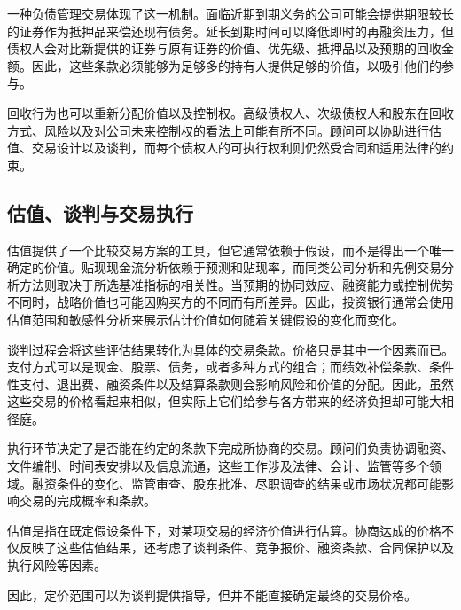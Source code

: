 一种负债管理交易体现了这一机制。面临近期到期义务的公司可能会提供期限较长的证券作为抵押品来偿还现有债务。延长到期时间可以降低即时的再融资压力，但债权人会对比新提供的证券与原有证券的价值、优先级、抵押品以及预期的回收金额。因此，这些条款必须能够为足够多的持有人提供足够的价值，以吸引他们的参与。

回收行为也可以重新分配价值以及控制权。高级债权人、次级债权人和股东在回收方式、风险以及对公司未来控制权的看法上可能有所不同。顾问可以协助进行估值、交易设计以及谈判，而每个债权人的可执行权利则仍然受合同和适用法律的约束。

\subsection{估值、谈判与交易执行}

估值提供了一个比较交易方案的工具，但它通常依赖于假设，而不是得出一个唯一确定的价值。贴现现金流分析依赖于预测和贴现率，而同类公司分析和先例交易分析方法则取决于所选基准指标的相关性。当预期的协同效应、融资能力或控制优势不同时，战略价值也可能因购买方的不同而有所差异。因此，投资银行通常会使用估值范围和敏感性分析来展示估计价值如何随着关键假设的变化而变化。

谈判过程会将这些评估结果转化为具体的交易条款。价格只是其中一个因素而已。支付方式可以是现金、股票、债务，或者多种方式的组合；而绩效补偿条款、条件性支付、退出费、融资条件以及结算条款则会影响风险和价值的分配。因此，虽然这些交易的价格看起来相似，但实际上它们给参与各方带来的经济负担却可能大相径庭。

执行环节决定了是否能在约定的条款下完成所协商的交易。顾问们负责协调融资、文件编制、时间表安排以及信息流通，这些工作涉及法律、会计、监管等多个领域。融资条件的变化、监管审查、股东批准、尽职调查的结果或市场状况都可能影响交易的完成概率和条款。

\begin{tcolorbox}[
  enhanced,
  breakable,
  colback=white,
  colframe=FinanceBlue,
  boxrule=0.7pt,
  sharp corners,
  borderline west={2.2pt}{0pt}{FinanceBlue},
  title=\textbf{财务展望：价值和价格并非等同的概念。},
  coltitle=white,
  colbacktitle=FinanceBlue,
  fonttitle=\bfseries,
  before skip=1.2em,
  after skip=1.2em
]

估值是指在既定假设条件下，对某项交易的经济价值进行估算。协商达成的价格不仅反映了这些估值结果，还考虑了谈判条件、竞争报价、融资条款、合同保护以及执行风险等因素。

因此，定价范围可以为谈判提供指导，但并不能直接确定最终的交易价格。

\end{tcolorbox}

